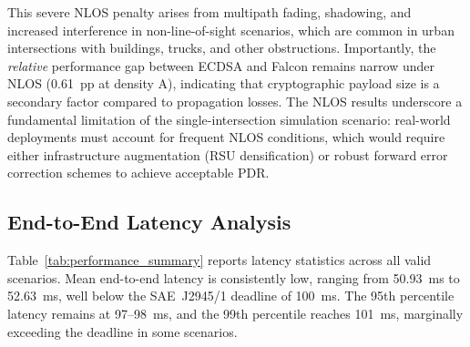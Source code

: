 \documentclass[letterpaper,journal]{IEEEtran}
\begin{document}
This severe NLOS penalty arises from multipath fading, shadowing, and increased interference in non-line-of-sight scenarios, which are common in urban intersections with buildings, trucks, and other obstructions. Importantly, the \emph{relative} performance gap between ECDSA and Falcon remains narrow under NLOS (0.61~pp at density A), indicating that cryptographic payload size is a secondary factor compared to propagation losses. The NLOS results underscore a fundamental limitation of the single-intersection simulation scenario: real-world deployments must account for frequent NLOS conditions, which would require either infrastructure augmentation (RSU densification) or robust forward error correction schemes to achieve acceptable PDR.

\subsection{End-to-End Latency Analysis}

Table~\ref{tab:performance_summary} reports latency statistics across all valid scenarios. Mean end-to-end latency is consistently low, ranging from 50.93~ms to 52.63~ms, well below the SAE~J2945/1 deadline of 100~ms. The 95th percentile latency remains at 97--98~ms, and the 99th percentile reaches 101~ms, marginally exceeding the deadline in some scenarios.
\end{document}
